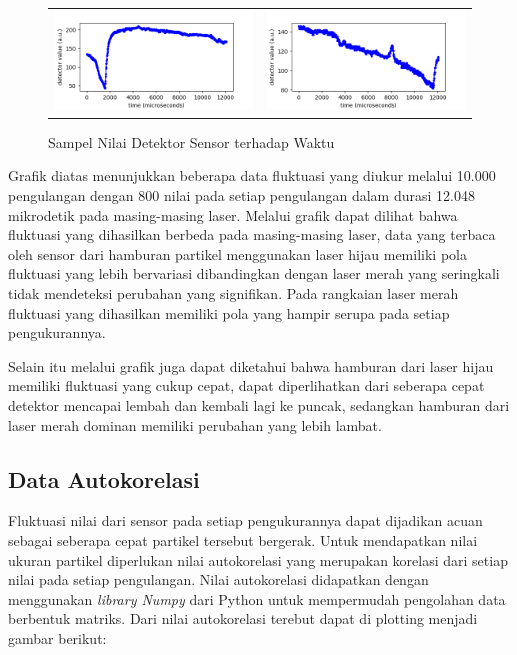 \begin{figure}
  \ContinuedFloat
  \begin{longtable}{p{7cm}p{7cm}}
    \includegraphics[width=8cm]{Images/RawData_Hijau_Data1000-01.png}
    \centering{Laser Hijau}
    &
    \includegraphics[width=8cm]{Images/RawData_Merah_Data1000-01.png} 
    \centering{Laser Merah}\\
  \end{longtable}

  \caption{Sampel Nilai Detektor Sensor terhadap Waktu}
\end{figure}

Grafik diatas menunjukkan beberapa data fluktuasi yang diukur
melalui 10.000 pengulangan dengan 800 nilai pada setiap
pengulangan dalam durasi 12.048 mikrodetik pada masing-masing
laser. Melalui grafik dapat dilihat bahwa fluktuasi yang
dihasilkan berbeda pada masing-masing laser, data yang terbaca
oleh sensor dari hamburan partikel menggunakan laser hijau
memiliki pola fluktuasi yang lebih bervariasi dibandingkan
dengan laser merah yang seringkali tidak mendeteksi perubahan
yang signifikan. Pada rangkaian laser merah  fluktuasi yang
dihasilkan memiliki pola yang hampir serupa pada setiap
pengukurannya.

Selain itu melalui grafik juga dapat diketahui bahwa hamburan
dari laser hijau memiliki fluktuasi yang cukup cepat, dapat
diperlihatkan dari seberapa cepat detektor mencapai lembah dan
kembali lagi ke puncak, sedangkan hamburan dari laser merah
dominan memiliki perubahan yang lebih lambat.

\subsection{Data Autokorelasi}
Fluktuasi nilai dari sensor pada setiap pengukurannya dapat
dijadikan acuan sebagai seberapa cepat partikel tersebut
bergerak. Untuk mendapatkan nilai ukuran partikel diperlukan
nilai autokorelasi yang merupakan korelasi dari setiap nilai
pada setiap pengulangan. Nilai autokorelasi didapatkan dengan
menggunakan \textit{library Numpy} dari Python untuk mempermudah
pengolahan data berbentuk matriks. Dari nilai autokorelasi
terebut dapat di plotting menjadi gambar berikut:

